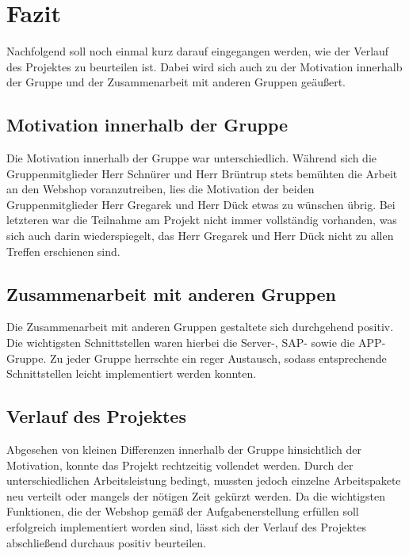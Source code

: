 \newpage
\section{Fazit}

Nachfolgend soll noch einmal kurz darauf eingegangen werden, wie der Verlauf des Projektes zu beurteilen ist. Dabei wird sich auch zu der Motivation innerhalb der Gruppe und der Zusammenarbeit mit anderen Gruppen geäußert.


\subsection{Motivation innerhalb der Gruppe}

Die Motivation innerhalb der Gruppe war unterschiedlich. Während sich die Gruppenmitglieder Herr Schnürer und Herr Brüntrup stets bemühten die Arbeit an den Webshop voranzutreiben, lies die Motivation der beiden Gruppenmitglieder Herr Gregarek und Herr Dück etwas zu wünschen übrig.  Bei letzteren war die Teilnahme am Projekt nicht immer vollständig vorhanden, was sich auch darin wiederspiegelt, das Herr Gregarek und Herr Dück nicht zu allen Treffen erschienen sind.

\subsection{Zusammenarbeit mit anderen Gruppen}
Die Zusammenarbeit mit anderen Gruppen gestaltete sich durchgehend positiv. Die wichtigsten Schnittstellen waren hierbei die Server-, SAP- sowie die APP-Gruppe. Zu jeder Gruppe herrschte ein reger Austausch, sodass entsprechende Schnittstellen leicht implementiert werden konnten.


\subsection{Verlauf des Projektes}

Abgesehen von kleinen Differenzen innerhalb der Gruppe hinsichtlich der Motivation, konnte das Projekt rechtzeitig vollendet werden. Durch der unterschiedlichen Arbeitsleistung bedingt, mussten jedoch einzelne Arbeitspakete neu verteilt oder mangels der nötigen Zeit gekürzt werden. Da die wichtigsten Funktionen, die der Webshop gemäß der Aufgabenerstellung erfüllen soll erfolgreich implementiert worden sind, lässt sich der Verlauf des Projektes abschließend durchaus positiv beurteilen.
